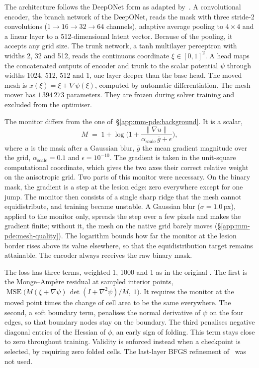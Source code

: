 The architecture follows the DeepONet form \citep{Lu2021} as adapted
by~\citet{Hu2024}. A convolutional encoder, the branch network of the
DeepONet, reads the mask with three stride-2 convolutions
($1 \to 16 \to 32 \to 64$ channels), adaptive average pooling to
$4 \times 4$ and a linear layer to a 512-dimensional latent vector. Because
of the pooling, it accepts any grid size. The trunk network, a tanh
multilayer perceptron with widths 2, 32 and 512, reads the continuous
coordinate $\xi \in [0,1]^2$. A head maps the concatenated outputs of
encoder and trunk to the scalar potential $\psi$ through widths 1024, 512,
512 and 1, one layer deeper than the base head. The moved mesh is
$x(\xi) = \xi + \nabla\psi(\xi)$, computed by automatic differentiation.
The mesh mover has $1\,394\,273$ parameters. They are frozen during solver
training and excluded from the optimiser.

The monitor differs from the one of~\S\ref{app:mm-pde:background}. It is a
scalar,
\begin{equation}
  M \;=\; 1 + \log\!\Big(1 + \frac{\lVert \nabla u \rVert}
  {\alpha_{\text{scale}}\, \bar g + \epsilon}\Big),
  \label{eq:appendix:monitor}
\end{equation}
where $u$ is the mask after a Gaussian blur, $\bar g$ the mean gradient
magnitude over the grid, $\alpha_{\text{scale}} = 0.1$ and
$\epsilon = 10^{-10}$. The gradient is taken in the unit-square
computational coordinate, which gives the two axes their correct relative
weight on the anisotropic grid. Two parts of this monitor were necessary.
On the binary mask, the gradient is a step at the lesion edge: zero
everywhere except for one jump. The monitor then consists of a single sharp
ridge that the mesh cannot equidistribute, and training became unstable. A
Gaussian blur ($\sigma = 1.0$\,px), applied to the monitor only, spreads the
step over a few pixels and makes the gradient finite; without it, the mesh
on the native grid barely moves (\S\ref{app:mm-pde:mesh-quality}). The
logarithm bounds how far the monitor at the lesion border rises above its
value elsewhere, so that the equidistribution target remains attainable.
The encoder always receives the raw binary mask.

The loss has three terms, weighted 1, 1000 and 1 as in the
original \citep{Hu2024}. The first is the
Monge--Amp\`ere residual at sampled interior points,
$\operatorname{MSE}\big(M(\xi + \nabla\psi)\,\det(I + \nabla^2\psi) /
\bar M,\ 1\big)$. It requires the monitor at the moved point times the
change of cell area to be the same everywhere. The second, a soft boundary
term, penalises the normal derivative of $\psi$ on the four edges, so that
boundary nodes stay on the boundary. The third penalises negative diagonal
entries of the Hessian of $\phi$, an early sign of folding. This term stays
close to zero throughout training. Validity is enforced instead when a
checkpoint is selected, by requiring zero folded cells. The last-layer BFGS
refinement of~\citet{Hu2024} was not used.

